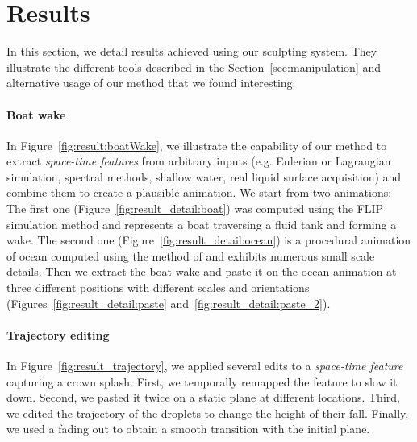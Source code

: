 \documentclass[review]{acmsiggraph}
\begin{document}

\section{Results} \label{sec:results}

In this section, we detail results achieved using our sculpting system.
They illustrate the different tools described in the Section~\ref{sec:manipulation} and alternative usage of our method that we found interesting.

\paragraph{Boat wake}

In Figure~\ref{fig:result:boatWake}, we illustrate the capability of our method to extract \emph{space-time features} from arbitrary inputs (e.g. Eulerian or Lagrangian simulation, spectral methods, shallow water, real liquid surface acquisition) and combine them to create a plausible animation.
We start from two animations: 
The first one (Figure~\ref{fig:result_detail:boat}) 
was computed using the FLIP simulation method \cite{zhu2005animating} and represents a boat traversing a fluid tank and forming a wake.
The second one (Figure~\ref{fig:result_detail:ocean}) is a procedural animation of ocean computed using the method of \cite{Tessendorf2004} and exhibits numerous small scale details.
Then we extract the boat wake and paste it on the ocean animation at three different positions with different scales and orientations (Figures~\ref{fig:result_detail:paste} and~\ref{fig:result_detail:paste_2}).

\paragraph{Trajectory editing}

In Figure~\ref{fig:result_trajectory}, we applied several edits to a \emph{space-time feature} capturing a crown splash. First, we temporally remapped the feature to slow it down. 
Second, we pasted it twice on a static plane at different locations. 
Third, we edited the trajectory of the droplets to change the height of their fall. 
Finally, we used a fading out to obtain a smooth transition with the initial plane.

%
\end{document}
